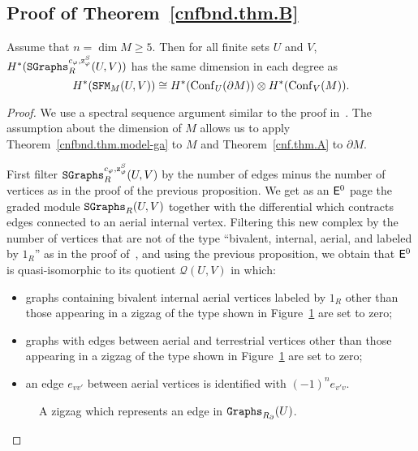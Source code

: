 \subsection{Proof of Theorem~\ref{cnfbnd.thm.B}}

\begin{proposition}
  Assume that $n = \dim M \ge 5$.
  Then for all finite sets $U$ and $V$, $H^{*}(\mathtt{SGraphs}^{c_{\varphi},\mathrm{z}^{S}_{\varphi}}_{R}(U,V))$ has the same dimension in each degree as
  \[H^{*}(\mathtt{SFM}_{M}(U,V)) \cong H^{*}(\operatorname{Conf}_{U}(\partial M)) \otimes H^{*}(\operatorname{Conf}_{V}(M)). \]
\end{proposition}
\begin{proof}
  We use a spectral sequence argument similar to the proof in~\cite[Section~5]{Willwacher2015a}.
  The assumption about the dimension of $M$ allows us to apply Theorem~\ref{cnfbnd.thm.model-ga} to $M$ and Theorem~\ref{cnf.thm.A} to $\partial M$.

  First filter $\mathtt{SGraphs}^{c_{\varphi}, \mathrm{z}^{S}_{\varphi}}_{R}(U,V)$ by the number of edges minus the number of vertices as in the proof of the previous proposition.
  We get as an $\mathsf{E}^{0}$ page the graded module $\mathtt{SGraphs}_{R}(U,V)$ together with the differential which contracts edges connected to an aerial internal vertex.
  Filtering this new complex by the number of vertices that are not of the type ``bivalent, internal, aerial, and labeled by $1_{R}$'' as in the proof of~\cite[Section~5]{Willwacher2015a}, and using the previous proposition, we obtain that $\mathsf{E}^{0}$ is quasi-isomorphic to its quotient $\mathcal{Q}(U,V)$ in which:
  \begin{itemize}
  \item graphs containing bivalent internal aerial vertices labeled by $1_{R}$ other than those appearing in a zigzag of the type shown in Figure~\ref{cnfbnd.fig.zigzag-graphs_R} are set to zero;
  \item graphs with edges between aerial and terrestrial vertices other than those appearing in a zigzag of the type shown in Figure~\ref{cnfbnd.fig.zigzag-graphs_R} are set to zero;
  \item an edge $e_{vv'}$ between aerial vertices is identified with $(-1)^{n} e_{v'v}$.
  \end{itemize}

  \begin{figure}[htbp]
    \centering
    \caption{A zigzag which represents an edge in $\mathtt{Graphs}_{R_{\partial}}(U)$.}
    \label{cnfbnd.fig.zigzag-graphs_R}
  \end{figure}


\end{proof}
